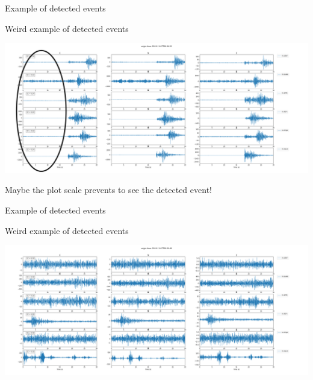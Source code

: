 \documentclass[aspectratio=43,9pt]{beamer}
\begin{document}
\begin{frame}{Example of detected events}
 
   \begin{minipage}{1\linewidth}
    \centering Weird example of detected events 
    \vskip 0.4cm 
    \begin{center}
     \includegraphics[width=1\linewidth]{figs/weird2_2019-11-07T00-36-52-1p2.png}     
    \end{center}
    \vskip 0.4cm
    Maybe the plot scale prevents to see the detected event!
  \end{minipage}
   
\end{frame}


\begin{frame}{Example of detected events}
 
   \begin{minipage}{1\linewidth}
    \centering Weird example of detected events 
    \vskip 0.4cm 
    \begin{center}
     \includegraphics[width=1\linewidth]{figs/weird_2019-11-07T00-20-49-1p3.png}     
    \end{center}
  \end{minipage}
   
\end{frame}
\end{document}
